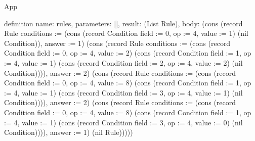 \begin{lexlean}{App}
\begin{semanticmodule}
definition{
  name: rules,
  parameters: [],
  result: (List Rule),
  body: (cons (record Rule {conditions := (cons (record Condition {field := 0, op := 4, value := 1}) (nil Condition)), answer := 1}) (cons (record Rule {conditions := (cons (record Condition {field := 0, op := 4, value := 2}) (cons (record Condition {field := 1, op := 4, value := 1}) (cons (record Condition {field := 2, op := 4, value := 2}) (nil Condition)))), answer := 2}) (cons (record Rule {conditions := (cons (record Condition {field := 0, op := 4, value := 8}) (cons (record Condition {field := 1, op := 4, value := 1}) (cons (record Condition {field := 3, op := 4, value := 1}) (nil Condition)))), answer := 2}) (cons (record Rule {conditions := (cons (record Condition {field := 0, op := 4, value := 8}) (cons (record Condition {field := 1, op := 4, value := 1}) (cons (record Condition {field := 3, op := 4, value := 0}) (nil Condition)))), answer := 1}) (nil Rule)))))
}


\end{semanticmodule}
\end{lexlean}
